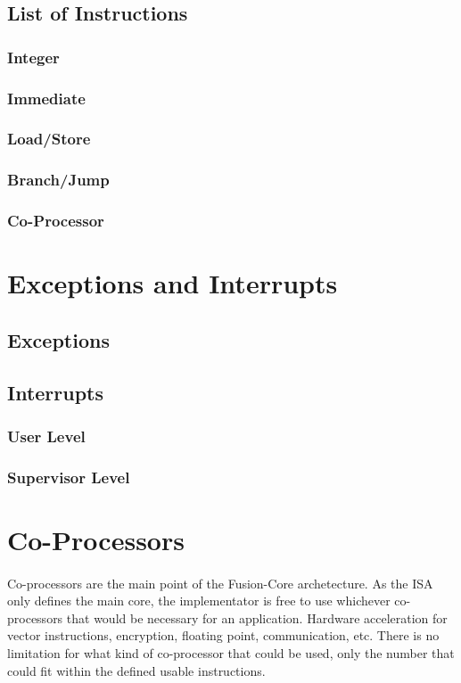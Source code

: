 \documentclass[letterpaper, 11pt]{article}
\begin{document}
\subsection{List of Instructions}
\subsubsection{Integer}
\subsubsection{Immediate}
\subsubsection{Load/Store}
\subsubsection{Branch/Jump}
\subsubsection{Co-Processor}



\section{Exceptions and Interrupts}
\subsection{Exceptions}


\subsection{Interrupts}
\subsubsection{User Level}
\subsubsection{Supervisor Level}

\section{Co-Processors}
\paragraph{}Co-processors are the main point of the Fusion-Core archetecture. As the ISA only defines the main core, the implementator is free to use
whichever co-processors that would be necessary for an application. Hardware acceleration for vector instructions, encryption, floating point, communication,
etc. There is no limitation for what kind of co-processor that could be used, only the number that could fit within the defined usable instructions.
\end{document}
